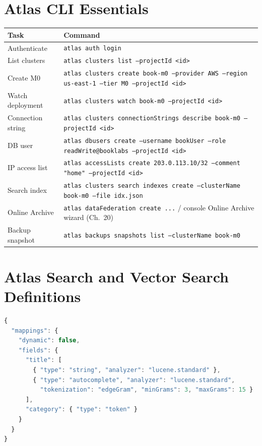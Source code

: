 \section{Atlas CLI Essentials}
%
\begin{center}
\footnotesize
\begin{tabular}{@{}p{5.6cm}p{7.2cm}@{}}
\toprule
\textbf{Task} & \textbf{Command} \\
\midrule
Authenticate & \texttt{atlas auth login} \\
List clusters & \texttt{atlas clusters list --projectId <id>} \\
Create M0 & \texttt{atlas clusters create book-m0 --provider AWS --region us-east-1 --tier M0 --projectId <id>} \\
Watch deployment & \texttt{atlas clusters watch book-m0 --projectId <id>} \\
Connection string & \texttt{atlas clusters connectionStrings describe book-m0 --projectId <id>} \\
DB user & \texttt{atlas dbusers create --username bookUser --role readWrite@booklabs --projectId <id>} \\
IP access list & \texttt{atlas accessLists create 203.0.113.10/32 --comment "home" --projectId <id>} \\
Search index & \texttt{atlas clusters search indexes create --clusterName book-m0 --file idx.json} \\
Online Archive & \texttt{atlas dataFederation create ...} / console Online Archive wizard (Ch.~20) \\
Backup snapshot & \texttt{atlas backups snapshots list --clusterName book-m0} \\
\bottomrule
\end{tabular}
\end{center}

\section{Atlas Search and Vector Search Definitions}
%
\begin{lstlisting}[language=JavaScript, caption={Atlas Search index: dynamic mapping plus an autocomplete field.}]
{
  "mappings": {
    "dynamic": false,
    "fields": {
      "title": [
        { "type": "string", "analyzer": "lucene.standard" },
        { "type": "autocomplete", "analyzer": "lucene.standard",
          "tokenization": "edgeGram", "minGrams": 3, "maxGrams": 15 }
      ],
      "category": { "type": "token" }
    }
  }
}
\end{lstlisting}

